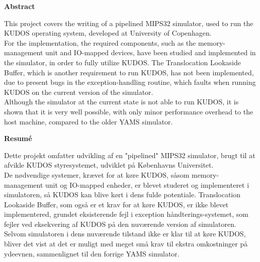 \begin{center}
\textbf{Abstract}\\
\end{center}
This project covers the writing of a pipelined MIPS32 simulator, used to run the
KUDOS operating system, developed at University of Copenhagen.\\
For the implementation, the required components, such as the memory-management
unit and IO-mapped devices, have been studied and implemented in the simulator,
in order to fully utilize KUDOS. The Translocation Lookaside Buffer, which is
another requirement to run KUDOS, has not been implemented, due to present bugs
in the exception-handling routine, which faults when running KUDOS on the
current version of the simulator.\\
Although the simulator at the current state is not able to run KUDOS, it is shown
that it is very well possible, with only minor performance overhead to the host
machine, compared to the older YAMS simulator.




\begin{center}
\textbf{Resumé}\\
\end{center}
Dette projekt omfatter udvikling af en "pipelined" MIPS32 simulator, brugt til at
afvikle KUDOS styresystemet, udviklet på Københavns Universitet.\\
De nødvendige systemer, krævet for at køre KUDOS, såsom memory-management unit og IO-mapped
enheder, er blevet studeret og implementeret i simulatoren, så KUDOS kan blive kørt
i dens fulde potentiale. Translocation Lookaside Buffer, som også er et krav for
at køre KUDOS, er ikke blevet implementered, grundet eksisterende fejl i
exception håndterings-systemet, som fejler ved eksekvering af KUDOS på den nuværende
version af simulatoren.\\
Selvom simulatoren i dens nuværende tilstand ikke er klar til at køre KUDOS, bliver
det vist at det er muligt med meget små krav til ekstra omkostninger på
ydeevnen, sammenlignet til den forrige YAMS simulator.

